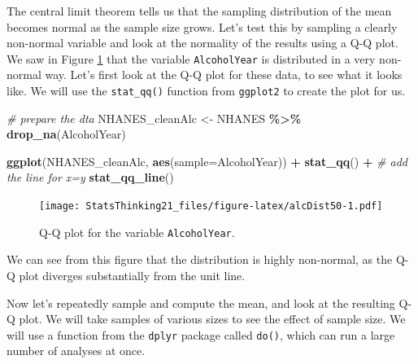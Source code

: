 \documentclass[
  12pt,
]{book}
\newenvironment{Shaded}{\begin{snugshade}}{\end{snugshade}}
\newcommand{\AttributeTok}[1]{\textcolor[rgb]{0.13,0.29,0.53}{#1}}
\newcommand{\CommentTok}[1]{\textcolor[rgb]{0.56,0.35,0.01}{\textit{#1}}}
\newcommand{\FunctionTok}[1]{\textcolor[rgb]{0.13,0.29,0.53}{\textbf{#1}}}
\newcommand{\NormalTok}[1]{#1}
\newcommand{\OtherTok}[1]{\textcolor[rgb]{0.56,0.35,0.01}{#1}}
\newcommand{\SpecialCharTok}[1]{\textcolor[rgb]{0.81,0.36,0.00}{\textbf{#1}}}
\begin{document}
The central limit theorem tells us that the sampling distribution of the mean becomes normal as the sample size grows. Let's test this by sampling a clearly non-normal variable and look at the normality of the results using a Q-Q plot. We saw in Figure \ref{fig:alcDist50} that the variable \texttt{AlcoholYear} is distributed in a very non-normal way. Let's first look at the Q-Q plot for these data, to see what it looks like. We will use the \texttt{stat\_qq()} function from \texttt{ggplot2} to create the plot for us.

\begin{Shaded}
\begin{Highlighting}[]
\CommentTok{\# prepare the dta}
\NormalTok{NHANES\_cleanAlc }\OtherTok{\textless{}{-}}\NormalTok{ NHANES }\SpecialCharTok{\%\textgreater{}\%}
  \FunctionTok{drop\_na}\NormalTok{(AlcoholYear)}

\FunctionTok{ggplot}\NormalTok{(NHANES\_cleanAlc, }\FunctionTok{aes}\NormalTok{(}\AttributeTok{sample=}\NormalTok{AlcoholYear)) }\SpecialCharTok{+}
  \FunctionTok{stat\_qq}\NormalTok{() }\SpecialCharTok{+} 
  \CommentTok{\# add the line for x=y}
  \FunctionTok{stat\_qq\_line}\NormalTok{()}
\end{Highlighting}
\end{Shaded}

\begin{figure}
\centering
\texttt{[image: StatsThinking21\_files/figure-latex/alcDist50-1.pdf]}
\caption{\label{fig:alcDist50}Q-Q plot for the variable \texttt{AlcoholYear}.}
\end{figure}

We can see from this figure that the distribution is highly non-normal, as the Q-Q plot diverges substantially from the unit line.

Now let's repeatedly sample and compute the mean, and look at the resulting Q-Q plot. We will take samples of various sizes to see the effect of sample size. We will use a function from the \texttt{dplyr} package called \texttt{do()}, which can run a large number of analyses at once.
\end{document}
